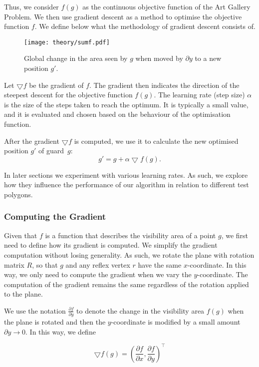 Thus, we consider $f(g)$ as the continuous objective function of the Art Gallery Problem. We  then use gradient descent as a method to optimise the objective function $f$. We define below what the methodology of gradient descent consists of.

\begin{figure}[h!]
    \centering
    \texttt{[image: theory/sumf.pdf]}
    \caption{Global change in the area seen by $g$ when moved by $\partial y$ to a new position $g'$.}
    \label{fig:sumf}
\end{figure}

\newpage
Let $\bigtriangledown f$ be the gradient of $f$. The gradient then indicates the direction of the steepest descent for the objective function $f(g)$.
The learning rate (step size) $\alpha$ is the size of the steps taken to reach the optimum. It is typically a small value, and it is evaluated and chosen based on the behaviour of the optimisation function. 

After the gradient $\bigtriangledown f$ is computed, we  use it to calculate the new optimised position $g'$ of guard~$g$: $$g' = g + \alpha\bigtriangledown f(g).$$


In later sections we experiment with various learning rates. As such, we  explore how they influence the performance of our algorithm in relation to different test polygons. 

\subsubsection{Computing the Gradient}

Given that $f$ is a function that describes the visibility area of a point $g$, we first need to define how its gradient is computed. We  simplify the gradient computation without losing generality. As such, we  rotate the plane with rotation matrix $R$, so that $g$ and any reflex vertex $r$ have the same $x$-coordinate. In this way, we only need to compute the gradient when we vary the $y$-coordinate. The computation of the gradient remains the same regardless of the rotation applied to the plane.


We  use the notation $\frac{\partial f}{\partial y}$ to denote the change in the visibility area $f(g)$ when the plane is rotated and then the $y$-coordinate is modified by a small amount $\partial y \rightarrow 0$. In this way, we define 

\begin{equation}
    \bigtriangledown f(g) = \left(\frac{\partial f}{\partial x}, \frac{\partial f}{\partial y}\right)^\intercal \label{eq:gradient}
\end{equation}

